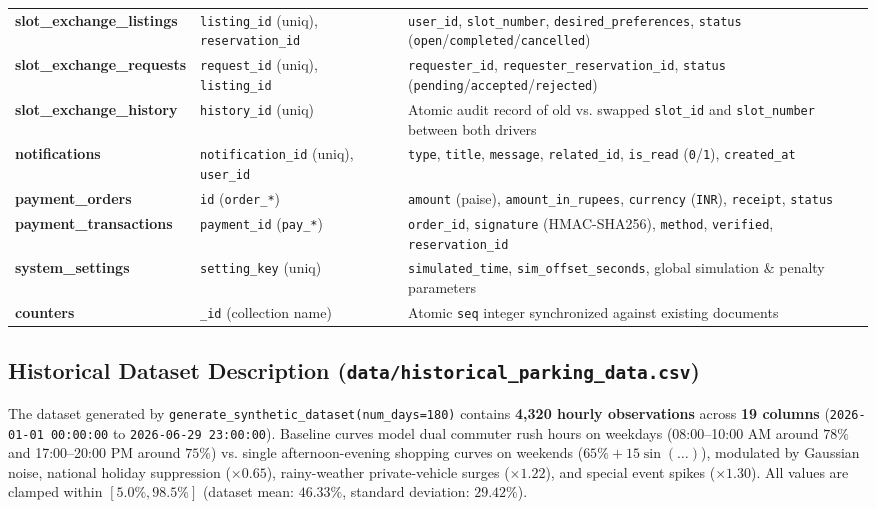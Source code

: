 \documentclass[12pt,a4paper,oneside]{report}
\begin{document}
\begin{longtable}{>{\bfseries\ttfamily}p{3.6cm} p{4.2cm} p{6.2cm}}
slot\_exchange\_listings & \texttt{listing\_id} (uniq), \texttt{reservation\_id} & \texttt{user\_id}, \texttt{slot\_number}, \texttt{desired\_preferences}, \texttt{status} (\texttt{open}/\texttt{completed}/\texttt{cancelled}) \\
slot\_exchange\_requests & \texttt{request\_id} (uniq), \texttt{listing\_id} & \texttt{requester\_id}, \texttt{requester\_reservation\_id}, \texttt{status} (\texttt{pending}/\texttt{accepted}/\texttt{rejected}) \\
slot\_exchange\_history & \texttt{history\_id} (uniq) & Atomic audit record of old vs. swapped \texttt{slot\_id} and \texttt{slot\_number} between both drivers \\
notifications & \texttt{notification\_id} (uniq), \texttt{user\_id} & \texttt{type}, \texttt{title}, \texttt{message}, \texttt{related\_id}, \texttt{is\_read} (\texttt{0}/\texttt{1}), \texttt{created\_at} \\
payment\_orders & \texttt{id} (\texttt{order\_*}) & \texttt{amount} (paise), \texttt{amount\_in\_rupees}, \texttt{currency} (\texttt{INR}), \texttt{receipt}, \texttt{status} \\
payment\_transactions & \texttt{payment\_id} (\texttt{pay\_*}) & \texttt{order\_id}, \texttt{signature} (HMAC-SHA256), \texttt{method}, \texttt{verified}, \texttt{reservation\_id} \\
system\_settings & \texttt{setting\_key} (uniq) & \texttt{simulated\_time}, \texttt{sim\_offset\_seconds}, global simulation \& penalty parameters \\
counters & \texttt{\_id} (collection name) & Atomic \texttt{seq} integer synchronized against existing documents \\
\bottomrule
\end{longtable}

\subsection{Historical Dataset Description (\texttt{data/historical\_parking\_data.csv})}
The dataset generated by \texttt{generate\_synthetic\_dataset(num\_days=180)} contains \textbf{4,320 hourly observations} across \textbf{19 columns} (\texttt{2026-01-01 00:00:00} to \texttt{2026-06-29 23:00:00}). Baseline curves model dual commuter rush hours on weekdays (08:00--10:00 AM around $78\%$ and 17:00--20:00 PM around $75\%$) vs. single afternoon-evening shopping curves on weekends ($65\% + 15\sin(\dots)$), modulated by Gaussian noise, national holiday suppression ($\times 0.65$), rainy-weather private-vehicle surges ($\times 1.22$), and special event spikes ($\times 1.30$). All values are clamped within $[5.0\%, 98.5\%]$ (dataset mean: $46.33\%$, standard deviation: $29.42\%$).
\end{document}
